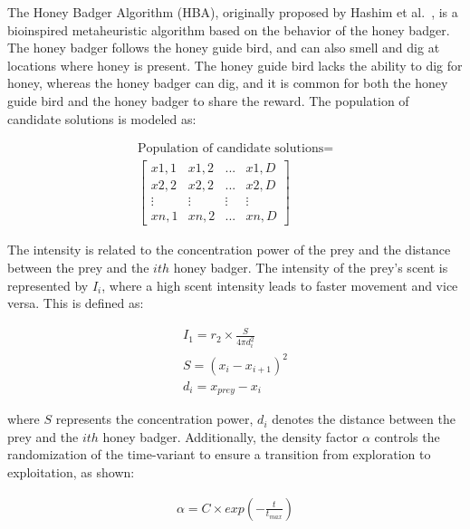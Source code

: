 \documentclass{elsarticle}
\begin{document}
The Honey Badger Algorithm (HBA), originally proposed by Hashim et al.~\cite{Hashim2022}, is a bioinspired metaheuristic algorithm based on the behavior of the honey badger. The honey badger follows the honey guide bird, and can also smell and dig at locations where honey is present. The honey guide bird lacks the ability to dig for honey, whereas the honey badger can dig, and it is common for both the honey guide bird and the honey badger to share the reward. The population of candidate solutions is modeled as:

\begin{equation}
\begin{gathered}
\text{Population of candidate solutions}=\\\begin{bmatrix}
  x1,1 & x1,2 & ... & x1,D  \\
  x2,2 & x2,2 & ... & x2,D  \\
  \vdots & \vdots & \vdots & \vdots \\
  xn,1 & xn,2 & ... & xn,D
\end{bmatrix}
\end{gathered}
\label{eq27}
\end{equation}

The intensity is related to the concentration power of the prey and the distance between the prey and the $ith$ honey badger. The intensity of the prey's scent is represented by $I_i$, where a high scent intensity leads to faster movement and vice versa. This is defined as:

\begin{equation}
\begin{gathered}
I_1 = r_2 \times \frac{S}{4 \pi d_i^2}\\
S = (x_i - x_{i+1})^2\\
d_i = x_{prey} - x_i
\end{gathered}
\label{eq28}
\end{equation}

\noindent 
where $S$ represents the concentration power, $d_i$ denotes the distance between the prey and the $ith$ honey badger. Additionally, the density factor $\alpha$ controls the randomization of the time-variant to ensure a transition from exploration to exploitation, as shown:

\begin{equation}
\begin{gathered}
\alpha = C \times exp\left(-\frac{t}{t_{max}}\right)\\
\end{gathered}
\label{eq29}
\end{equation}
\end{document}
